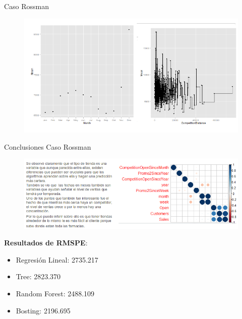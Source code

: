 \documentclass{bredelebeamer}
\begin{document}

\begin{frame}{Caso Rossman}

\begin{figure}[H]
\centering
\includegraphics[scale=.35]{images/Zuri6.png}
\end{figure}

\end{frame}


\begin{frame}{Conclusiones Caso Rossman}

\begin{figure}[H]
\centering
\includegraphics[scale=.42]{images/Zuri7.png}
\end{figure}

\textbf{Resultados de RMSPE}:

\begin{itemize}

  \item Regresión Lineal: 2735.217
  \item Tree: 2823.370
  \item Random Forest: 2488.109
  \item Bosting: 2196.695

\end{itemize}

\end{frame}
\end{document}
